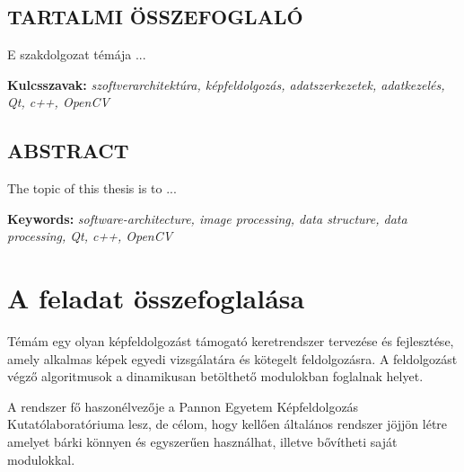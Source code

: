 \documentclass[a4paper,12pt,oneside]{report}
\begin{document}
\begin{center}
\section*{\textbf{\Large \MakeUppercase{Tartalmi összefoglaló}}}
\end{center}

E szakdolgozat témája ...

\vspace{2cm}

{\bf Kulcsszavak:} {\it szoftverarchitektúra, képfeldolgozás, adatszerkezetek, adatkezelés, Qt, c++, OpenCV}
\newpage

\newpage

\begin{center}
\section*{\textbf{\Large \MakeUppercase{Abstract}}}
\end{center}

The topic of this thesis is to ...

\vspace{2cm}

{\bf Keywords:} {\it software-architecture, image processing, data structure, data processing, Qt, c++, OpenCV}
\newpage
\listoftodos

\renewcommand{\thefigure}{\arabic{figure}}

\setcounter{tocdepth}{3} %
\thispagestyle{empty}
\tableofcontents
\pagebreak

\setcounter{page}{1} %
\pagestyle{plain}
\fancyhead[C]{\rightmark}
\fancyfoot[R]{\thepage}

\section{A feladat összefoglalása}

Témám egy olyan képfeldolgozást támogató keretrendszer tervezése és fejlesztése, amely alkalmas képek egyedi vizsgálatára és kötegelt feldolgozásra. A feldolgozást végző algoritmusok a dinamikusan betölthető modulokban foglalnak helyet.

A rendszer fő haszonélvezője a Pannon Egyetem Képfeldolgozás Kutatólaboratóriuma lesz, de célom, hogy kellően általános rendszer jöjjön létre amelyet bárki könnyen és egyszerűen használhat, illetve bővítheti saját modulokkal.
\end{document}
